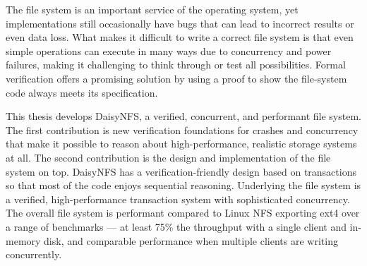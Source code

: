 The file system is an important service of the operating system, yet
implementations still occasionally have bugs that can lead to incorrect results
or even data loss. What makes it difficult to write a correct file system is
that even simple operations can execute in many ways due to concurrency and
power failures, making it challenging to think through or test all
possibilities. Formal verification offers a promising solution by using a proof
to show the file-system code always meets its specification.

This thesis develops DaisyNFS, a verified, concurrent, and performant file
system. The first contribution is new verification foundations for crashes and
concurrency that make it possible to reason about high-performance, realistic
storage systems at all. The second contribution is the design and implementation
of the file system on top. DaisyNFS has a verification-friendly design based on
transactions so that most of the code enjoys sequential reasoning. Underlying
the file system is a verified, high-performance transaction system with
sophisticated concurrency. The overall file system is performant compared to
Linux NFS exporting ext4 over a range of benchmarks --- at least 75\% the
throughput with a single client and in-memory disk, and comparable performance
when multiple clients are writing concurrently. 
